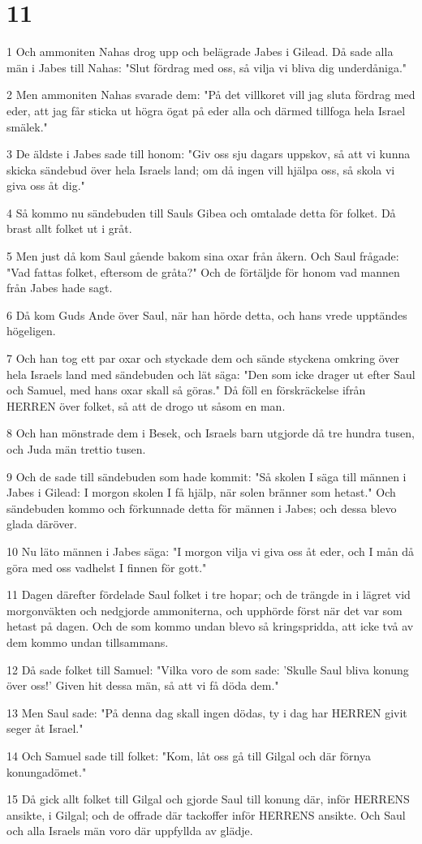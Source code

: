 \chapter{11}

\par 1 Och ammoniten Nahas drog upp och belägrade Jabes i Gilead. Då sade alla män i Jabes till Nahas: "Slut fördrag med oss, så vilja vi bliva dig underdåniga."
\par 2 Men ammoniten Nahas svarade dem: "På det villkoret vill jag sluta fördrag med eder, att jag får sticka ut högra ögat på eder alla och därmed tillfoga hela Israel smälek."
\par 3 De äldste i Jabes sade till honom: "Giv oss sju dagars uppskov, så att vi kunna skicka sändebud över hela Israels land; om då ingen vill hjälpa oss, så skola vi giva oss åt dig."
\par 4 Så kommo nu sändebuden till Sauls Gibea och omtalade detta för folket. Då brast allt folket ut i gråt.
\par 5 Men just då kom Saul gående bakom sina oxar från åkern. Och Saul frågade: "Vad fattas folket, eftersom de gråta?" Och de förtäljde för honom vad mannen från Jabes hade sagt.
\par 6 Då kom Guds Ande över Saul, när han hörde detta, och hans vrede upptändes högeligen.
\par 7 Och han tog ett par oxar och styckade dem och sände styckena omkring över hela Israels land med sändebuden och lät säga: "Den som icke drager ut efter Saul och Samuel, med hans oxar skall så göras." Då föll en förskräckelse ifrån HERREN över folket, så att de drogo ut såsom en man.
\par 8 Och han mönstrade dem i Besek, och Israels barn utgjorde då tre hundra tusen, och Juda män trettio tusen.
\par 9 Och de sade till sändebuden som hade kommit: "Så skolen I säga till männen i Jabes i Gilead: I morgon skolen I få hjälp, när solen bränner som hetast." Och sändebuden kommo och förkunnade detta för männen i Jabes; och dessa blevo glada däröver.
\par 10 Nu läto männen i Jabes säga: "I morgon vilja vi giva oss åt eder, och I mån då göra med oss vadhelst I finnen för gott."
\par 11 Dagen därefter fördelade Saul folket i tre hopar; och de trängde in i lägret vid morgonväkten och nedgjorde ammoniterna, och upphörde först när det var som hetast på dagen. Och de som kommo undan blevo så kringspridda, att icke två av dem kommo undan tillsammans.
\par 12 Då sade folket till Samuel: "Vilka voro de som sade: 'Skulle Saul bliva konung över oss!' Given hit dessa män, så att vi få döda dem."
\par 13 Men Saul sade: "På denna dag skall ingen dödas, ty i dag har HERREN givit seger åt Israel."
\par 14 Och Samuel sade till folket: "Kom, låt oss gå till Gilgal och där förnya konungadömet."
\par 15 Då gick allt folket till Gilgal och gjorde Saul till konung där, inför HERRENS ansikte, i Gilgal; och de offrade där tackoffer inför HERRENS ansikte. Och Saul och alla Israels män voro där uppfyllda av glädje.


